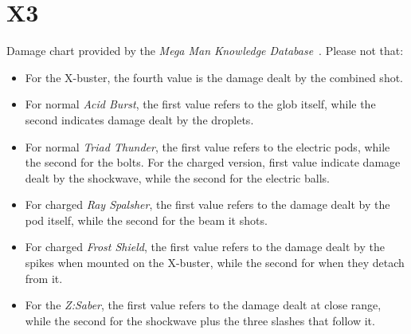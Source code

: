 \newpage
\section{X3}
Damage chart provided by the \emph{Mega Man Knowledge Database}~\cite{wiki:damage_chart_X3}. 
Please not that:
\begin{itemize}
	\item For the X-buster, the fourth value is the damage dealt by the combined shot.
	\item For normal \emph{Acid Burst}, the first value refers to the glob itself, while the second indicates damage dealt by the droplets.
	\item For normal \emph{Triad Thunder}, the first value refers to the electric pods, while the second for the bolts. For the charged version, first value indicate damage dealt by the shockwave, while the second for  the electric balls.
	\item For charged \emph{Ray Spalsher}, the first value refers to the damage dealt by the pod itself, while the second for the beam it shots.
	\item For charged \emph{Frost Shield}, the first value refers to the damage dealt by the spikes when mounted on the X-buster, while the second for when they detach from it.
	\item For the \emph{Z:Saber}, the first value refers to the damage dealt at close range, while the second for the shockwave plus the three slashes that follow it.
\end{itemize}

